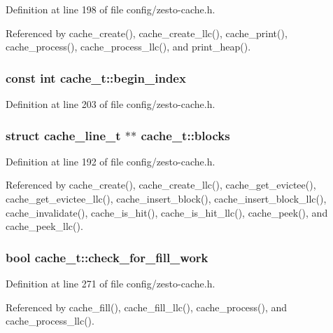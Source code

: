 Definition at line 198 of file config/zesto-cache.h.

Referenced by cache\_\-create(), cache\_\-create\_\-llc(), cache\_\-print(), cache\_\-process(), cache\_\-process\_\-llc(), and print\_\-heap().
\subsubsection[{begin\_\-index}]{\setlength{\rightskip}{0pt plus 5cm}const int {\bf cache\_\-t::begin\_\-index}}\label{structcache__t_730b08cfadc9cdab2188c38cef6c0e8f}




Definition at line 203 of file config/zesto-cache.h.
\subsubsection[{blocks}]{\setlength{\rightskip}{0pt plus 5cm}struct {\bf cache\_\-line\_\-t} $\ast$$\ast$ {\bf cache\_\-t::blocks}\hspace{0.3cm}{\tt  [read]}}\label{structcache__t_36501a20f3f325263b4edfdfd7e89092}




Definition at line 192 of file config/zesto-cache.h.

Referenced by cache\_\-create(), cache\_\-create\_\-llc(), cache\_\-get\_\-evictee(), cache\_\-get\_\-evictee\_\-llc(), cache\_\-insert\_\-block(), cache\_\-insert\_\-block\_\-llc(), cache\_\-invalidate(), cache\_\-is\_\-hit(), cache\_\-is\_\-hit\_\-llc(), cache\_\-peek(), and cache\_\-peek\_\-llc().
\subsubsection[{check\_\-for\_\-fill\_\-work}]{\setlength{\rightskip}{0pt plus 5cm}bool {\bf cache\_\-t::check\_\-for\_\-fill\_\-work}}\label{structcache__t_ae38cc21fdfc0dec5bcaf96a8f658b47}




Definition at line 271 of file config/zesto-cache.h.

Referenced by cache\_\-fill(), cache\_\-fill\_\-llc(), cache\_\-process(), and cache\_\-process\_\-llc().
